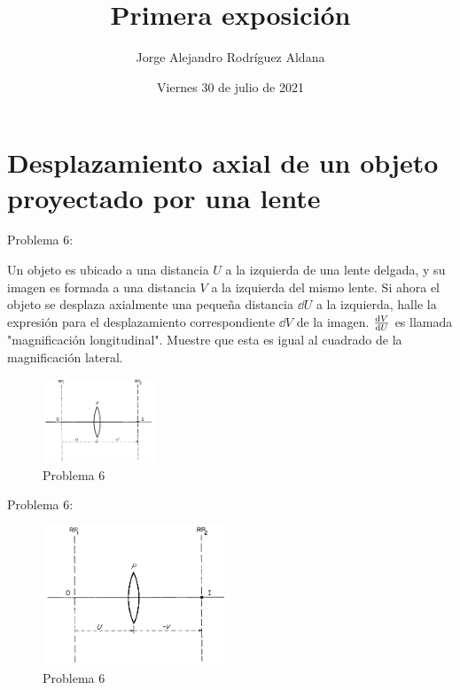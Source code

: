 \documentclass{beamer}
\title{Primera exposición}
\date{Viernes 30 de julio de 2021}
\author{Jorge Alejandro Rodríguez Aldana}
\institute{Escuela de Ciencias Físicas y Matemáticas}
\begin{document}
  \maketitle
  \section{Desplazamiento axial de un objeto proyectado por una lente}
  \begin{frame}{Problema 6:}

    Un objeto es ubicado a una distancia $U$ a la izquierda de una
    lente delgada, y su imagen es formada a una distancia $V$ a la
    izquierda del mismo lente. Si ahora el 
    objeto se desplaza axialmente una pequeña distancia $\dd U$ a la
    izquierda, halle la expresión para el desplazamiento correspondiente
    $\dd V$ de la imagen. $\dv{V}{U}$ es llamada "magnificación longitudinal". 
    Muestre que esta es igual al cuadrado de la magnificación lateral.

    \begin{figure}
        \includegraphics[width=0.3\textwidth]{Figures/Book3.png}
        \caption{Problema 6}
        \label{fig-1}
    \end{figure}
  \end{frame}

  \begin{frame}{Problema 6:}
    \begin{figure}
      \includegraphics[width=0.5\textwidth]{Figures/Book3.png}
      \caption{Problema 6}
      \label{fig-2}
    \end{figure}
  \end{frame}
\end{document}
